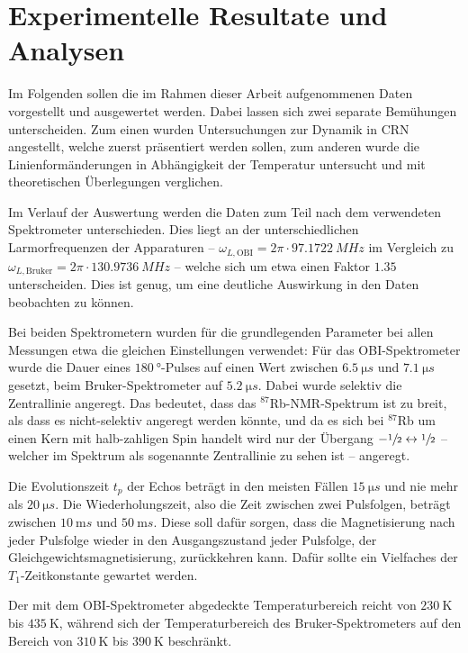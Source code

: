 \chapter{Experimentelle Resultate und Analysen}
\label{chapter:experiment}

Im Folgenden sollen die im Rahmen dieser Arbeit aufgenommenen Daten vorgestellt und ausgewertet werden. Dabei lassen sich zwei separate Bemühungen unterscheiden. Zum einen wurden Untersuchungen zur Dynamik in CRN angestellt, welche zuerst präsentiert werden sollen, zum anderen wurde die Linienformänderungen in Abhängigkeit der Temperatur untersucht und mit theoretischen Überlegungen verglichen.

Im Verlauf der Auswertung werden die Daten zum Teil nach dem verwendeten Spektrometer unterschieden. Dies liegt an der unterschiedlichen Larmorfrequenzen der Apparaturen -- $\omega_{L, \text{OBI}} = 2\pi \cdot \SI{97.1722}{MHz}$ im Vergleich zu $\omega_{L, \text{Bruker}} = 2\pi \cdot \SI{130.9736}{MHz}$ -- welche sich um etwa einen Faktor $\SI{1.35}{}$ unterscheiden. Dies ist genug, um eine deutliche Auswirkung in den Daten beobachten zu können.

Bei beiden Spektrometern wurden für die grundlegenden Parameter bei allen Messungen etwa die gleichen Einstellungen verwendet: Für das OBI-Spektrometer wurde die Dauer eines $\SI{180}{\degree}$-Pulses auf einen Wert zwischen $\SI{6.5}{\micro s}$ und $\SI{7.1}{\micro s}$ gesetzt, beim Bruker-Spektrometer auf $\SI{5.2}{\micro s}$. Dabei wurde selektiv die Zentrallinie angeregt. Das bedeutet, dass das $^\text{87}$Rb-NMR-Spektrum ist zu breit, als dass es nicht-selektiv angeregt werden könnte, und da es sich bei $^\text{87}$Rb um einen Kern mit halb-zahligen Spin handelt wird nur der Übergang $-\sfrac{1}{2} \leftrightarrow \sfrac{1}{2}$ -- welcher im Spektrum als sogenannte Zentrallinie zu sehen ist -- angeregt.

Die Evolutionszeit $t_p$ der Echos beträgt in den meisten Fällen $\SI{15}{\micro s}$ und nie mehr als $\SI{20}{\micro s}$. Die Wiederholungszeit, also die Zeit zwischen zwei Pulsfolgen, beträgt zwischen $\SI{10}{\milli s}$ und $\SI{50}{\milli s}$. Diese soll dafür sorgen, dass die Magnetisierung nach jeder Pulsfolge wieder in den Ausgangszustand jeder Pulsfolge, der Gleichgewichtsmagnetisierung, zurückkehren kann. Dafür sollte ein Vielfaches der $T_1$-Zeitkonstante gewartet werden.

Der mit dem OBI-Spektrometer abgedeckte Temperaturbereich reicht von $\SI{230}{\kelvin}$ bis $\SI{435}{\kelvin}$, während sich der Temperaturbereich des Bruker-Spektrometers auf den Bereich von $\SI{310}{\kelvin}$ bis $\SI{390}{\kelvin}$ beschränkt.

